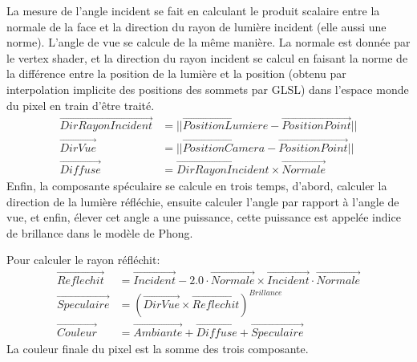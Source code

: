 \documentclass[pdftex, 11pt, a4paper, titlepage]{article}
\newcommand{\vect}[1]{\overrightarrow{#1}}
\begin{document}
La mesure de l'angle incident se fait en calculant le produit scalaire 
entre la normale de la face et la direction du rayon de lumière incident
(elle aussi une norme). L'angle de vue se calcule de la même manière.
La normale est donnée par le vertex shader, et la direction du rayon incident
 se calcul en faisant la norme de la différence entre la position de la
 lumière et la position (obtenu par interpolation implicite des positions des
 sommets par GLSL) dans l'espace monde du pixel en train d'être traité.
\begin{align*}
\vect{DirRayonIncident} &= ||\vect{PositionLumiere} -  \vect{PositionPoint}||\\
\vect{DirVue} &= ||\vect{PositionCamera} -  \vect{PositionPoint}|| \\
\vect{Diffuse} &= \vect{DirRayonIncident} \times \vect{Normale}
\end{align*}
Enfin, la composante spéculaire se calcule en trois temps, d'abord, calculer
la direction de la lumière réfléchie, ensuite calculer l'angle par rapport à 
l'angle de vue, et enfin, élever cet angle a une puissance, cette puissance
est appelée indice de brillance dans le modèle de Phong.

Pour calculer le rayon réfléchit:
\begin{align*}
\vect{Reflechit} &= \vect{Incident} - 2.0 \cdot \vect{Normale} \times \vect{Incident} \cdot \vect{Normale} \\
\vect{Speculaire} &= (\vect{DirVue} \times  \vect{Reflechit})^{Brillance} \\
\vect{Couleur} &= \vect{Ambiante} + \vect{Diffuse} + \vect{Speculaire}
\end{align*}
La couleur finale du pixel est la somme des trois composante.
\end{document}
